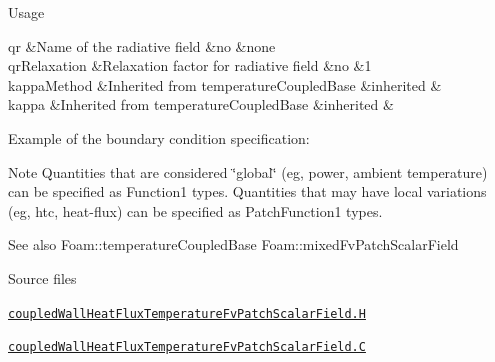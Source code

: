 \begin{DoxyParagraph}{Usage}
\begin{longtabu}
{\ttfamily qr}  &Name of the radiative field  &no  &none  \\
{\ttfamily qr\+Relaxation}  &Relaxation factor for radiative field  &no  &1  \\
{\ttfamily kappa\+Method}  &Inherited from temperature\+Coupled\+Base  &inherited  &\\
{\ttfamily kappa}  &Inherited from temperature\+Coupled\+Base  &inherited  &\\
\end{longtabu}
\begin{DoxyVerb}Example of the boundary condition specification:
\end{DoxyVerb}

\end{DoxyParagraph}
\begin{DoxyNote}{Note}
Quantities that are considered \char`\"{}global\char`\"{} (eg, power, ambient temperature) can be specified as Function1 types. Quantities that may have local variations (eg, htc, heat-\/flux) can be specified as Patch\+Function1 types.
\end{DoxyNote}
\begin{DoxySeeAlso}{See also}
Foam\+::temperature\+Coupled\+Base Foam\+::mixed\+Fv\+Patch\+Scalar\+Field
\end{DoxySeeAlso}
\begin{DoxyParagraph}{Source files}

\begin{DoxyItemize}
\item \href{../../../home/carlo/data/GeN-Foam/GeN-Foam_ffn/GeN-Foam/GeN-Foam/FMU4FOAM/ECI4FOAM/src/externalComm/externalIO/input/BC/coupledWallHeatFluxTemperature/coupledWallHeatFluxTemperatureFvPatchScalarField.H}{\tt coupled\+Wall\+Heat\+Flux\+Temperature\+Fv\+Patch\+Scalar\+Field.\+H} 
\item \href{../../../home/carlo/data/GeN-Foam/GeN-Foam_ffn/GeN-Foam/GeN-Foam/FMU4FOAM/ECI4FOAM/src/externalComm/externalIO/input/BC/coupledWallHeatFluxTemperature/coupledWallHeatFluxTemperatureFvPatchScalarField.C}{\tt coupled\+Wall\+Heat\+Flux\+Temperature\+Fv\+Patch\+Scalar\+Field.\+C} 
\end{DoxyItemize}
\end{DoxyParagraph}


